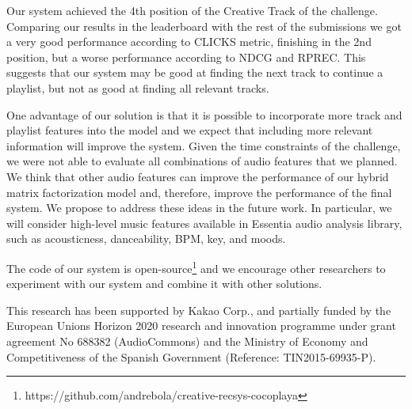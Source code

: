 Our system achieved the 4th position of the Creative Track of the challenge. Comparing our results in the leaderboard with the rest of the submissions we got a very good performance according to CLICKS metric, finishing in the 2nd position, but a worse performance according to NDCG and RPREC. This suggests that our system may be good at finding the next track to continue a playlist, but not as good at finding all relevant tracks.

One advantage of our solution is that it is possible to incorporate more track and playlist features into the model and we expect that including more relevant information will improve the system. Given the time constraints of the challenge, we were not able to evaluate all combinations of audio features that we planned. We think that other audio features can improve the performance of our hybrid matrix factorization model and, therefore, improve the performance of the final system.  We propose to address these ideas in the future work. In particular, we will consider high-level music features available in Essentia audio analysis library, such as acousticness, danceability, BPM, key, and moods.

The code of our system is open-source\footnote{https://github.com/andrebola/creative-recsys-cocoplaya} and we encourage other researchers to experiment with our system and combine it with other solutions.%

\begin{acks}
This research has been supported by Kakao Corp., 
and partially funded by the European Unions Horizon 2020 research and innovation programme under grant agreement No 688382 (AudioCommons) and 
the  Ministry of Economy and Competitiveness of the Spanish Government (Reference: TIN2015-69935-P). 
\end{acks}